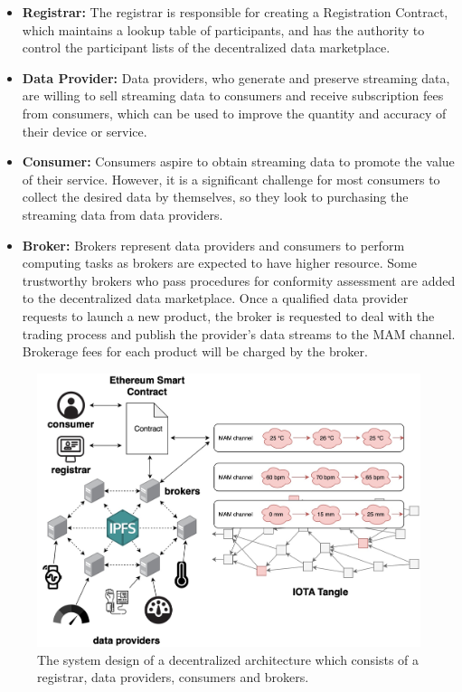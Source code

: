 \documentclass[journal,article,applsci,submit,moreauthors,pdftex]{Definitions/mdpi}
\begin{document}
\begin{itemize}[leftmargin=*,labelsep=5.8mm]
\item \textbf{Registrar: }
The registrar is responsible for creating a Registration Contract, which maintains a lookup table of participants, and has the authority to control the participant lists of the decentralized data marketplace.
\item \textbf{Data Provider: }
Data providers, who generate and preserve streaming data, are willing to sell streaming data to consumers and receive subscription fees from consumers, which can be used to improve the quantity and accuracy of their device or service.
\item \textbf{Consumer: }
Consumers aspire to obtain streaming data to promote the value of their service. However, it is a significant challenge for most consumers to collect the desired data by themselves, so they look to purchasing the streaming data from data providers.
\item \textbf{Broker: }
Brokers represent data providers and consumers to perform computing tasks as brokers are expected to have higher resource. Some trustworthy brokers who pass procedures for conformity assessment are added to the decentralized data marketplace. Once a qualified data provider requests to launch a new product, the broker is requested to deal with the trading process and publish the provider’s data streams to the MAM channel. Brokerage fees for each product will be charged by the broker.
\end{itemize}

\begin{figure}[h]
    \centering
    \includegraphics[width=3.3 in]{system_design}
    \caption{The system design of a decentralized architecture which consists of a registrar, data providers, consumers and brokers.}
    \label{fig:system_design}
\end{figure}
\end{document}
